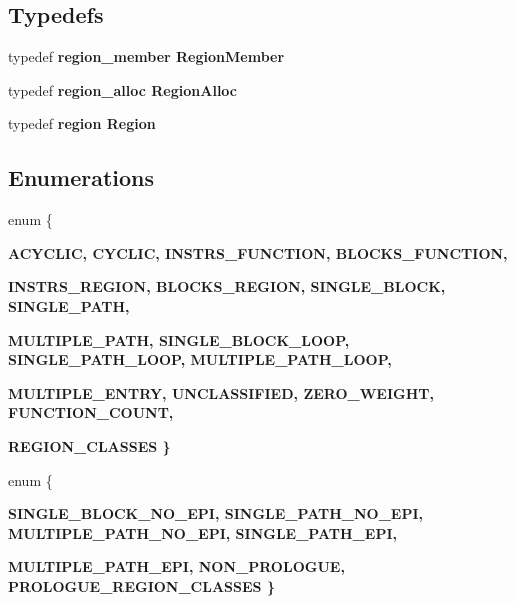 \subsection*{Typedefs}
\begin{CompactItemize}
\item 
typedef \bf{region\_\-member} \bf{Region\-Member}
\item 
typedef \bf{region\_\-alloc} \bf{Region\-Alloc}
\item 
typedef \bf{region} \bf{Region}
\end{CompactItemize}
\subsection*{Enumerations}
\begin{CompactItemize}
\item 
enum \{ \par
\bf{ACYCLIC}, 
\bf{CYCLIC}, 
\bf{INSTRS\_\-FUNCTION}, 
\bf{BLOCKS\_\-FUNCTION}, 
\par
\bf{INSTRS\_\-REGION}, 
\bf{BLOCKS\_\-REGION}, 
\bf{SINGLE\_\-BLOCK}, 
\bf{SINGLE\_\-PATH}, 
\par
\bf{MULTIPLE\_\-PATH}, 
\bf{SINGLE\_\-BLOCK\_\-LOOP}, 
\bf{SINGLE\_\-PATH\_\-LOOP}, 
\bf{MULTIPLE\_\-PATH\_\-LOOP}, 
\par
\bf{MULTIPLE\_\-ENTRY}, 
\bf{UNCLASSIFIED}, 
\bf{ZERO\_\-WEIGHT}, 
\bf{FUNCTION\_\-COUNT}, 
\par
\bf{REGION\_\-CLASSES}
 \}
\item 
enum \{ \par
\bf{SINGLE\_\-BLOCK\_\-NO\_\-EPI}, 
\bf{SINGLE\_\-PATH\_\-NO\_\-EPI}, 
\bf{MULTIPLE\_\-PATH\_\-NO\_\-EPI}, 
\bf{SINGLE\_\-PATH\_\-EPI}, 
\par
\bf{MULTIPLE\_\-PATH\_\-EPI}, 
\bf{NON\_\-PROLOGUE}, 
\bf{PROLOGUE\_\-REGION\_\-CLASSES}
 \}
\end{CompactItemize}
